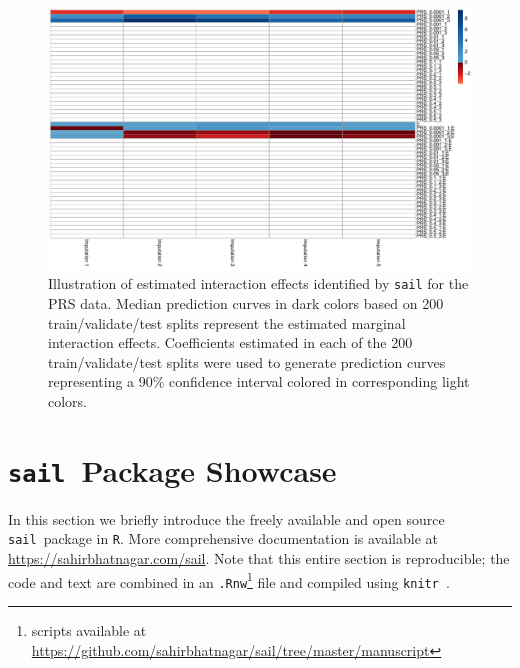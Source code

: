 \documentclass[12pt,letter]{article}\usepackage[]{graphicx}\usepackage[]{color}
\newenvironment{knitrout}{}{} %
\newcommand{\sail}{\texttt{sail}}
\begin{document}
\begin{knitrout}\scriptsize
{}\color{fgcolor}\begin{figure}[H]

{\centering \includegraphics[width=1\linewidth]{figure/PRS-model-selection-1} 

}

\caption[Illustration of estimated interaction effects identified by \texttt{sail} for the PRS data]{Illustration of estimated interaction effects identified by \texttt{sail} for the PRS data. Median prediction curves in dark colors based on 200 train/validate/test splits represent the estimated marginal interaction effects. Coefficients estimated in each of the 200 train/validate/test splits were used to generate prediction curves representing a 90\% confidence interval colored in corresponding light colors.}\label{fig:PRS-model-selection}
\end{figure}


\end{knitrout}


\FloatBarrier

\section{\sail ~Package Showcase} \label{ap:showcase}

In this section we briefly introduce the freely available and open source \sail ~package in \texttt{R}. More comprehensive documentation is available at \url{https://sahirbhatnagar.com/sail}. Note that this entire section is reproducible; the code and text are combined in an \texttt{.Rnw}\footnote[1]{scripts available at \url{https://github.com/sahirbhatnagar/sail/tree/master/manuscript}} file and compiled using \texttt{knitr}~\citep{xie2015dynamic}.
\end{document}
